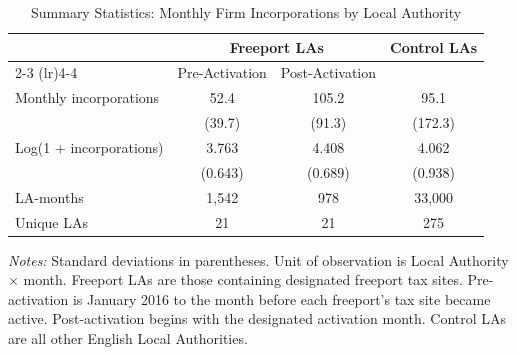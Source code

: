 \begin{table}[htbp]
\centering
\caption{Summary Statistics: Monthly Firm Incorporations by Local Authority}
\label{tab:summary}
\begin{tabular}{lccc}
\hline\hline
 & \multicolumn{2}{c}{Freeport LAs} & Control LAs \\
\cmidrule(lr){2-3} \cmidrule(lr){4-4}
 & Pre-Activation & Post-Activation & \\
\hline
Monthly incorporations & 52.4 & 105.2 & 95.1 \\
 & (39.7) & (91.3) & (172.3) \\
Log(1 + incorporations) & 3.763 & 4.408 & 4.062 \\
 & (0.643) & (0.689) & (0.938) \\
LA-months & 1,542 & 978 & 33,000 \\
Unique LAs & 21 & 21 & 275 \\
\hline\hline
\end{tabular}
\begin{tablenotes}[flushleft]
\small
\item \textit{Notes:} Standard deviations in parentheses. Unit of observation is Local Authority $\times$ month. Freeport LAs are those containing designated freeport tax sites. Pre-activation is January 2016 to the month before each freeport's tax site became active. Post-activation begins with the designated activation month. Control LAs are all other English Local Authorities.
\end{tablenotes}
\end{table}
